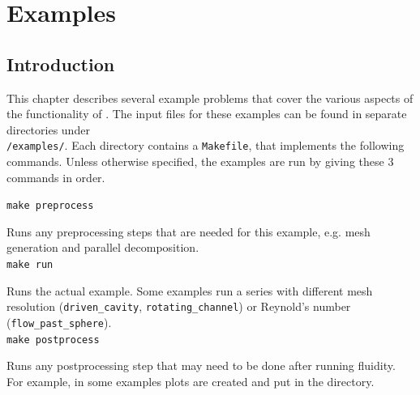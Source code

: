 \chapter{Examples}
\label{chap:examples}
\section{Introduction}
\label{sec:examples_introduction}
This chapter describes several example problems that cover the various aspects of the functionality
of \fluidity. The input files for these examples can be found in separate directories
under \\ \texttt{\fluiditysourcepath/examples/}. Each directory contains a \texttt{Makefile},
that implements the following commands. Unless otherwise specified, the examples are run by giving these 3 commands in order.

\hspace{0.05\textwidth}
\begin{minipage}{0.9\textwidth}
\texttt{make preprocess}

Runs any preprocessing steps that are needed for this example, e.g. mesh generation and
parallel decomposition.
\ \\

\texttt{make run}

Runs the actual example. Some examples run a series with different mesh resolution
(\texttt{driven\_cavity}, \texttt{rotating\_channel}) or Reynold's number
(\texttt{flow\_past\_sphere}).
\ \\

\texttt{make postprocess}

Runs any postprocessing step that may need to be done after running fluidity. For example, in some
examples plots are created and put in the directory.
\end{minipage}

